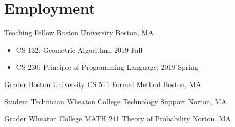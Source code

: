 \documentclass[11pt,a4paper,roman]{moderncv}        %
\begin{document}
\section{Employment}

{Teaching Fellow}
{Boston University}
{Boston, MA}{}
{
  \begin{itemize}[nosep]
    \item CS 132: Geometric Algorithm, 2019 Fall
    \item CS 230: Principle of Programming Language, 2019 Spring
  \end{itemize}
}

{Grader}
{Boston University CS 511 Formal Method}
{Boston, MA}{}{}

{Student Technician}
{Wheaton College Technology Support}
{Norton, MA}{}{}

{Grader}
{Wheaton College MATH 241 Theory of Probability}
{Norton, MA}{}{}
\end{document}
